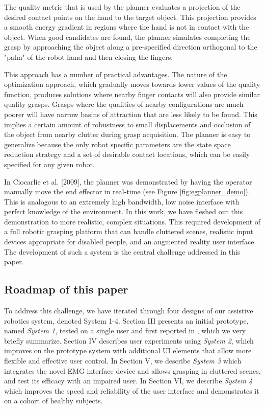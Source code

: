 The quality metric that is used by the planner evaluates a projection of the desired contact points on the hand to the target object. This projection provides a smooth energy gradient in regions where the hand is not in contact with the object. When good candidates are found, the planner simulates completing the grasp by approaching the object along a pre-specified direction orthogonal to the "palm" of the robot hand and then closing the fingers. 

This approach has a number of practical advantages. The nature of the optimization approach, which gradually moves towards lower values of the quality function, produces solutions where nearby finger contacts will also provide similar quality grasps. Grasps where the qualities of nearby configurations are much poorer will have narrow basins of attraction that are less likely to be found. This implies a certain amount of robustness to small displacements and occlusion of the object from nearby clutter during grasp acquisition. The planner is easy to generalize because the only robot specific parameters are the state space reduction strategy and a set of desirable contact locations, which can be easily specified for any given robot. 

In Ciocarlie et al. [2009], the planner was demonstrated by having the operator manually move the end effector in real-time (see Figure \ref{fig:egplanner_demo}). This is analogous to an extremely high bandwidth, low noise interface with perfect knowledge of the environment. In this work, we have fleshed out this demonstration to more realistic, complex situations. This required development of a full robotic grasping platform that can handle cluttered scenes, realistic input devices appropriate for disabled people, and an augmented reality user interface. The development of such a system is the central challenge addressed in this paper.  


\subsection{ Roadmap of this paper}

To address this challenge, we have iterated through four designs of our assistive robotics system, denoted System 1-4. Section III presents an initial prototype, named \emph{System 1}, tested on a single user and first reported in \cite{Weisz2012c}, which we very briefly summarize.  Section IV describes user experiments using \emph{System 2}, which improves on the prototype system with additional UI elements that allow more flexible and effective user control. In Section V, we describe \emph{System 3} which integrates the novel EMG interface device and allows grasping in cluttered scenes, and test its efficacy with an impaired user. In Section VI, we describe \emph{System 4} which improves the speed and reliability of the user interface and demonstrates it on a cohort of healthy subjects. 


















